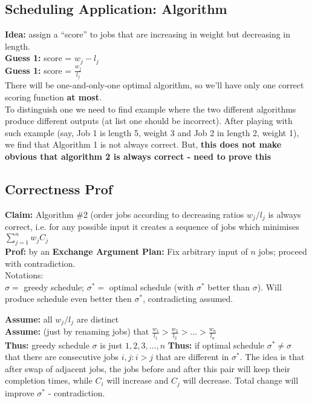 \documentclass{scrartcl}
\begin{document}
\subsection{Scheduling Application: Algorithm}
\label{sec:4-2} {\bf Idea:} assign a ``score'' to jobs that are increasing in
weight but decreasing in length. \\
{\bf Guess 1:} score = $w_j - l_j$\\
{\bf Guess 1:} score = $\frac{w_j}{l_j}$\\
There will be one-and-only-one optimal algorithm, so we'll have only one correct
scoring function {\bf at most}. \\
To distinguish one we need to find example where the two different algorithms
produce different outputs (at list one should be incorrect). After playing with
such example (say, Job 1 is length 5, weight 3 and Job 2 in length 2, weight 1),
we find that Algorithm 1 is not always correct. But, {\bf this does not make
  obvious that algorithm 2 is always correct - need to prove this}

\subsection{Correctness Prof}
\label{sec:4-3} {\bf Claim: } Algorithm \#2 (order jobs according to decreasing
ratios $w_j/l_j$ is always correct, i.e. for any possible input it creates a
sequence of jobs
which minimises $\sum \limits_{j=1}^n w_jC_j $ \\
{\bf Prof: } by an {\bf Exchange Argument}
{\bf Plan: } Fix arbitrary input of $n$ jobs; proceed with contradiction.\\
Notations:\\
$\sigma =$ greedy schedule; $\sigma^* = $ optimal schedule (with $\sigma^*$
better than $\sigma$). Will produce schedule even better then $\sigma^*$,
contradicting assumed.

{\bf Assume: } all $w_j/l_j$ are distinct \\
{\bf Assume: } (just by renaming jobs) that $\frac{w_1}{l_1} > \frac{w_2}{l_2} >
\dots > \frac{w_n}{l_n}$ \\
{\bf Thus: } greedy schedule $\sigma$ is just $1, 2, 3, \dots, n$ {\bf Thus: }
if optimal schedule $\sigma^* \neq \sigma$ that there are consecutive jobs $i,
j: i > j$ that are different in $\sigma^*$.
The idea is that after swap of adjacent jobs, the jobs before and after this
pair will keep their completion times, while $C_i$ will increase and $C_j$ will
decrease. Total change will improve $\sigma^*$ - contradiction.
\end{document}
